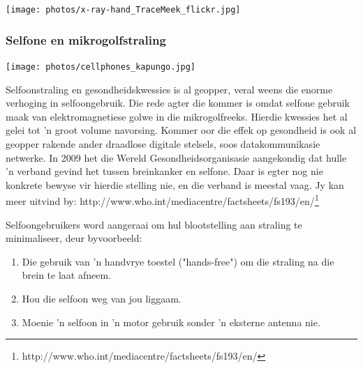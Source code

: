 \begin{minipage}{.5\textwidth}\begin{center}
 \texttt{[image: photos/x-ray-hand\_TraceMeek\_flickr.jpg]}\end{center}
\end{minipage}

            \subsubsection*{Selfone en mikrogolfstraling}
            \nopagebreak
\begin{minipage}{.5\textwidth}
\texttt{[image: photos/cellphones\_kapungo.jpg]}
\end{minipage}
\begin{minipage}{.5\textwidth}
            \label{m38779*id189654} Selfoonstraling en gesondheidskwessies is al geopper, veral weens die enorme verhoging in selfoongebruik. Die rede agter die kommer is omdat selfone gebruik maak van elektromagnetiese golwe in die mikrogolfreeks. Hierdie kwessies het al gelei tot 'n groot volume navorsing. Kommer oor die effek op gesondheid is ook al geopper rakende ander draadlose digitale stelsels, soos datakommunikasie netwerke. 
In 2009 het die Wereld Gesondheidsorganisasie aangekondig dat hulle 'n verband gevind het tussen breinkanker en selfone. Daar is egter nog nie konkrete bewyse vir hierdie stelling nie, en die verband is meestal vaag. Jy kan meer uitvind by: http://www.who.int/mediacentre/factsheets/fs193/en/\footnote{http://www.who.int/mediacentre/factsheets/fs193/en/}
        \par 
\end{minipage}
        \label{m38779*id189664} Selfoongebruikers word aangeraai om hul blootstelling aan straling te minimaliseer, deur byvoorbeeld:\par 
        \label{m38779*id189668}\begin{enumerate}[noitemsep, label=\textbf{\arabic*}. ] 
            \label{m38779*uid24}\item Die gebruik van 'n handvrye toestel ("hands-free") om die straling na die brein te laat afneem.
\label{m38779*uid25}\item Hou die selfoon weg van jou liggaam.
\label{m38779*uid26}\item Moenie 'n selfoon in 'n motor gebruik sonder 'n eksterne antenna nie. 
\end{enumerate}
        \label{m38779*uid27}

